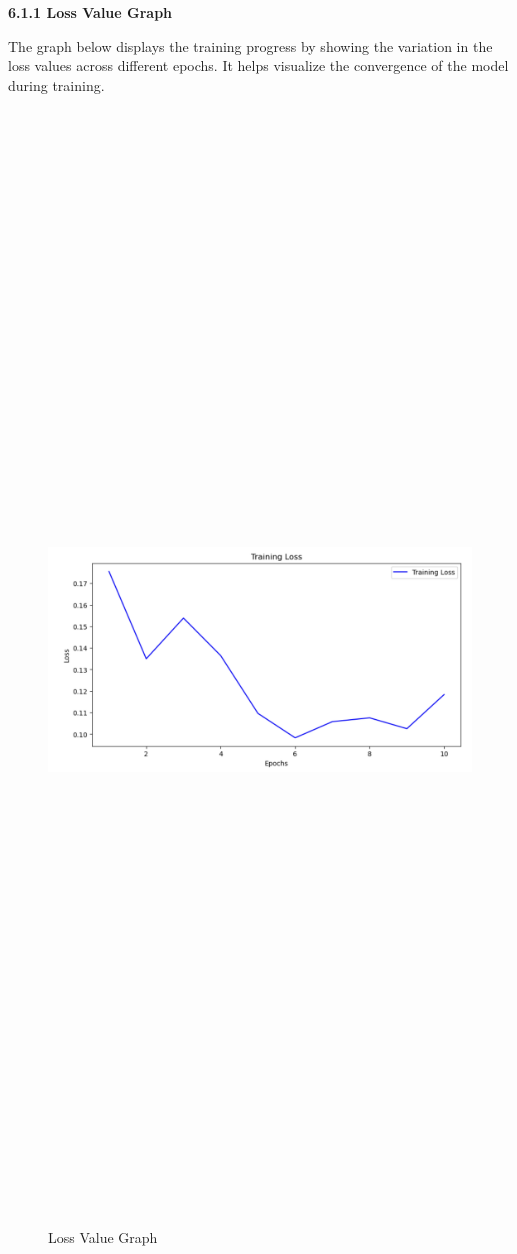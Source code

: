 \documentclass[a4paper,12pt]{article}
\begin{document}
{{{\begin{flushleft}
			\fontsize{13}{15}\selectfont\textbf{6.1.1 Loss Value Graph}
			\label{lvg}
		\end{flushleft}

The graph below displays the training progress by showing the variation in the loss values across different epochs. It helps visualize the convergence of the model during training.

\begin{figure}[htbp]
			\centering
			\includegraphics[width=6in, height=15in, keepaspectratio]{trainingloss.png}
			\label{loss}
			\caption{Loss Value Graph }
		\end{figure}
  


}}}
\end{document}
